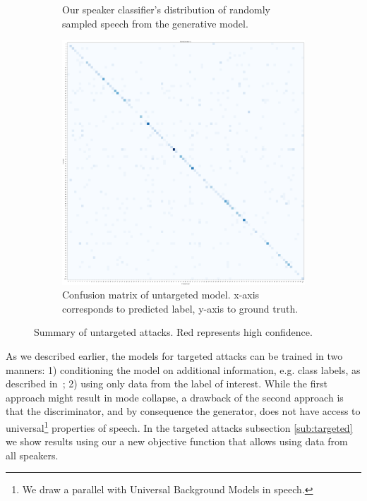 \begin{figure}[t]
\begin{subfigure}[b]{0.4\textwidth}
        \caption{Our speaker classifier's distribution of randomly sampled 
        speech from the generative model.}
        \label{fig:histogram_untargeted}
    \end{subfigure}
    \qquad
    \begin{subfigure}[b]{0.3\textwidth}
        \includegraphics[width=\textwidth]{./fig/conf_mat_cnn_knn.png}
        \caption{Confusion matrix of untargeted model. x-axis corresponds to predicted label, y-axis to ground truth.}
        \label{fig:histogram_untargeted}
    \end{subfigure}
    \caption{Summary of untargeted attacks. Red represents high confidence.}
    \label{fig:conf_mat_cnn_knn}
\end{figure}

As we described earlier, the models for targeted attacks can be trained in two manners: 1) 
conditioning the model on additional information, e.g. class labels, as
described in~\cite{mirza2014conditional}; 2) using only data from the label 
of interest. While the first approach might result in mode collapse, a drawback
of the second approach is that the discriminator, and by consequence the
generator, does not have access to universal\footnote{We draw a parallel with 
Universal Background Models in speech.} properties of speech. In the targeted 
attacks subsection \ref{sub:targeted} we show results using our a new objective function that allows 
using data from all speakers.  

